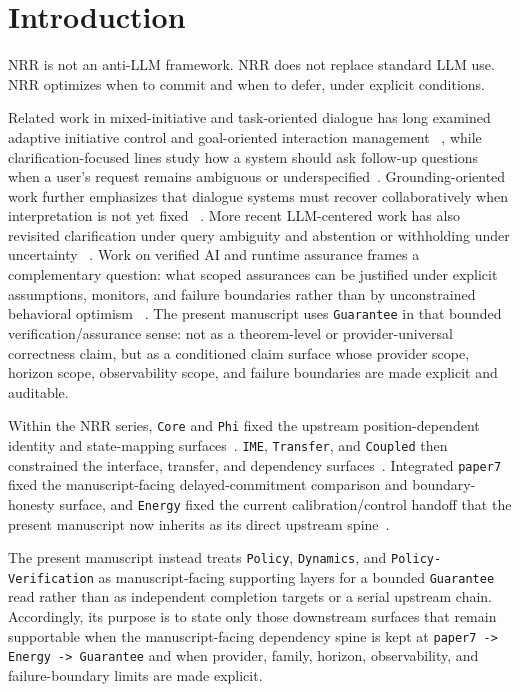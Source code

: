 \documentclass[11pt]{article}
\begin{document}
\section{Introduction}

NRR is not an anti-LLM framework. NRR does not replace standard LLM use. NRR
optimizes when to commit and when to defer, under explicit conditions.

Related work in mixed-initiative and task-oriented dialogue has long examined
adaptive initiative control and goal-oriented interaction management
~\cite{chucarroll2000mimic,wen2017taskdialogue}, while clarification-focused lines
study how a system should ask follow-up questions when a user's request remains
ambiguous or underspecified~\cite{deboni2003clarification,rao2018evpi,hu2020interactive}. Grounding-oriented work further emphasizes that dialogue systems
must recover collaboratively when interpretation is not yet fixed
~\cite{benotti2021groundedclarifications,benotti2021grounding}. More recent
LLM-centered work has also revisited clarification under query ambiguity and
abstention or withholding under uncertainty
~\cite{sahay-etal-2025-ask,wen-etal-2025-know,madhusudhan-etal-2025-llms}.
Work on verified AI and runtime assurance frames a complementary question:
what scoped assurances can be justified under explicit assumptions, monitors,
and failure boundaries rather than by unconstrained behavioral optimism
~\cite{seshia2022verifiedai,desai2019soter}. The present manuscript uses
\texttt{Guarantee} in that bounded verification/assurance sense: not as a
theorem-level or provider-universal correctness claim, but as a conditioned
claim surface whose provider scope, horizon scope, observability scope, and
failure boundaries are made explicit and auditable.

Within the NRR series, \texttt{Core} and \texttt{Phi} fixed the upstream
position-dependent identity and state-mapping surfaces~\cite{saito2025nrr,saito2026phi}.
\texttt{IME}, \texttt{Transfer}, and \texttt{Coupled} then constrained the
interface, transfer, and dependency surfaces~\cite{saito2026ime,saito2026transfer,saito2026coupled}.
Integrated \texttt{paper7} fixed the manuscript-facing delayed-commitment
comparison and boundary-honesty surface, and \texttt{Energy} fixed the current
calibration/control handoff that the present manuscript now inherits as its
direct upstream spine~\cite{saito2026principles,saito2026energy}.

The present manuscript instead treats \texttt{Policy}, \texttt{Dynamics}, and
\texttt{Policy-Verification} as manuscript-facing supporting layers for a
bounded \texttt{Guarantee} read rather than as independent completion targets
or a serial upstream chain. Accordingly, its purpose is to state only those
downstream surfaces that remain supportable when the manuscript-facing
dependency spine is kept at \texttt{paper7 -> Energy -> Guarantee} and when
provider, family, horizon, observability, and failure-boundary limits are made
explicit.
\end{document}
